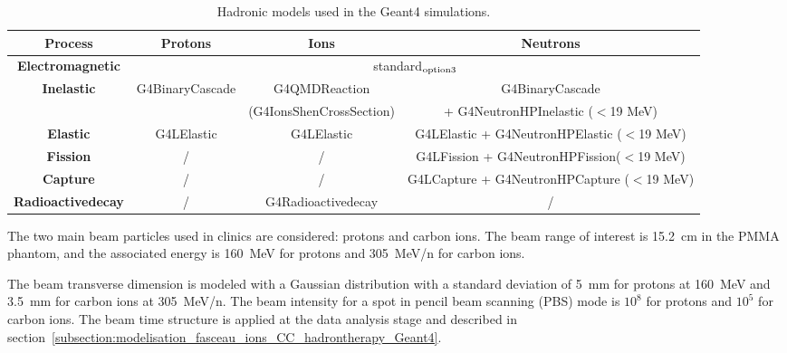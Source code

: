 \begin{table}
\label{physlist_ion}
\caption{Hadronic models used in the Geant4 simulations.}
\begin{scriptsize}
\begin{center}
\renewcommand{\arraystretch}{1.2}
\begin{tabular} {cccc}\hline
\textbf{Process} & \textbf{Protons} & \textbf{Ions} & \textbf{Neutrons} \\ \hline 
\textbf{Electromagnetic} & \multicolumn{3}{c}{standard$_{\rm{option3}}$} \\ %
\textbf{Inelastic} & G4BinaryCascade & G4QMDReaction  &  G4BinaryCascade  \\ 
 & & (G4IonsShenCrossSection)&+ G4NeutronHPInelastic ($<$19 MeV)\\ %
\textbf{Elastic} & G4LElastic & G4LElastic & G4LElastic + G4NeutronHPElastic ($<$19 MeV)\\ %
\textbf{Fission} & / & / & G4LFission + G4NeutronHPFission($<$19 MeV) \\ %
\textbf{Capture} & / & / & G4LCapture +  G4NeutronHPCapture ($<$19 MeV) \\ %
\textbf{Radioactivedecay} & / & G4Radioactivedecay & / \\ \hline
\end{tabular}
\end{center}
\end{scriptsize}
\label{table:table_modele_physic_CC_simulation_Hadronth}
\end{table}

The two main beam particles used in clinics are considered: protons and carbon ions. The beam range of interest is 15.2~cm in the PMMA phantom, and the associated energy is 160~MeV for protons and 305~MeV/n for carbon ions.
 
The beam transverse dimension is modeled with a Gaussian distribution with a standard deviation of 5~mm for protons at 160~MeV and 3.5~mm for carbon ions at 305~MeV/n. The beam intensity for a spot in pencil beam scanning (PBS) mode is $10^8$ for protons and $10^5$ for carbon ions. The beam time structure is applied at the data analysis stage and described in section~\ref{subsection:modelisation_fasceau_ions_CC_hadrontherapy_Geant4}.\newline


